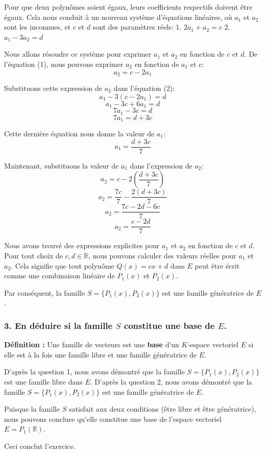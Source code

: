 \documentclass{report}
\begin{document}
Pour que deux polynômes soient égaux, leurs coefficients respectifs doivent être égaux. Cela nous conduit à un nouveau système d'équations linéaires, où $a_1$ et $a_2$ sont les inconnues, et $c$ et $d$ sont des paramètres réels:
1.  $2a_1 + a_2 = c$
2.  $a_1 - 3a_2 = d$

Nous allons résoudre ce système pour exprimer $a_1$ et $a_2$ en fonction de $c$ et $d$.
De l'équation (1), nous pouvons exprimer $a_2$ en fonction de $a_1$ et $c$:
$$a_2 = c - 2a_1$$

Substituons cette expression de $a_2$ dans l'équation (2):
$$a_1 - 3(c - 2a_1) = d$$
$$a_1 - 3c + 6a_1 = d$$
$$7a_1 - 3c = d$$
$$7a_1 = d + 3c$$

Cette dernière équation nous donne la valeur de $a_1$:
$$a_1 = \frac{d+3c}{7}$$

Maintenant, substituons la valeur de $a_1$ dans l'expression de $a_2$:
$$a_2 = c - 2\left(\frac{d+3c}{7}\right)$$
$$a_2 = \frac{7c}{7} - \frac{2(d+3c)}{7}$$
$$a_2 = \frac{7c - 2d - 6c}{7}$$
$$a_2 = \frac{c-2d}{7}$$

Nous avons trouvé des expressions explicites pour $a_1$ et $a_2$ en fonction de $c$ et $d$. Pour tout choix de $c, d \in \mathbb{R}$, nous pouvons calculer des valeurs réelles pour $a_1$ et $a_2$. Cela signifie que tout polynôme $Q(x) = cx+d$ dans $E$ peut être écrit comme une combinaison linéaire de $P_1(x)$ et $P_2(x)$.

Par conséquent, la famille $S = \{P_1(x), P_2(x)\}$ est une famille génératrice de $E$.

\subsubsection*{3. En déduire si la famille $S$ constitue une base de $E$.}

\textbf{Définition :} Une famille de vecteurs est une \textbf{base} d'un $K$-espace vectoriel $E$ si elle est à la fois une famille libre et une famille génératrice de $E$.

D'après la question 1, nous avons démontré que la famille $S = \{P_1(x), P_2(x)\}$ est une famille libre dans $E$.
D'après la question 2, nous avons démontré que la famille $S = \{P_1(x), P_2(x)\}$ est une famille génératrice de $E$.

Puisque la famille $S$ satisfait aux deux conditions (être libre et être génératrice), nous pouvons conclure qu'elle constitue une base de l'espace vectoriel $E = P_1(\mathbb{R})$.

Ceci conclut l'exercice.
\end{document}
